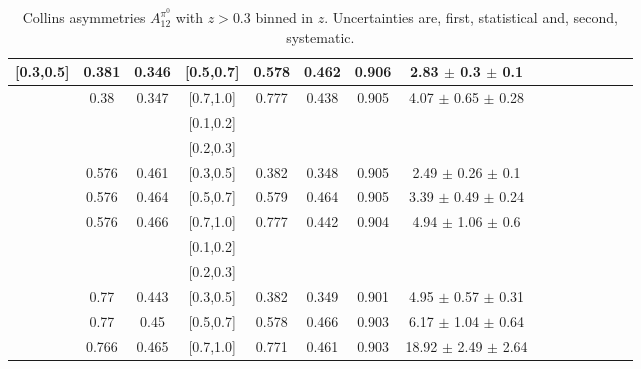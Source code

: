\documentclass[aps,prX,preprint,groupedaddress,linenumbers]{revtex4-1}
\begin{document}
\begin{table}[H]
\begin{tabular}{|c| c| c| c| c| c| c| c| c| c|c| c| c| c| c|}
[0.3,0.5]	&	0.381	&	0.346	&	[0.5,0.7]	&	0.578	&	0.462	&	0.906	& 2.83  $\pm$ 0.3  $\pm$ 0.1    	\\ \hline
[0.3,0.5]	&	0.38	&	0.347	&	[0.7,1.0]	&	0.777	&	0.438	&	0.905	& 4.07  $\pm$ 0.65  $\pm$ 0.28  	\\ \hline
\hline
[0.5,0.7]	&		&		&	[0.1,0.2]	&		&		&		&							\\ \hline
[0.5,0.7]	&		&		&	[0.2,0.3]	&		&		&		&							\\ \hline
[0.5,0.7]	&	0.576	&	0.461	&	[0.3,0.5]	&	0.382	&	0.348	&	0.905	&2.49  $\pm$ 0.26  $\pm$ 0.1  	\\ \hline
[0.5,0.7]	&	0.576	&	0.464	&	[0.5,0.7]	&	0.579	&	0.464	&	0.905	&3.39  $\pm$ 0.49  $\pm$ 0.24 	\\ \hline
[0.5,0.7]	&	0.576	&	0.466	&	[0.7,1.0]	&	0.777	&	0.442	&	0.904	&4.94  $\pm$ 1.06  $\pm$ 0.6  	\\ \hline
\hline
[0.7,1.0]	&		&		&	[0.1,0.2]	&		&		&		&							\\ \hline
[0.7,1.0]	&		&		&	[0.2,0.3]	&		&		&		&							\\ \hline
[0.7,1.0]	&	0.77	&	0.443	&	[0.3,0.5]	&	0.382	&	0.349	&	0.901	&4.95  $\pm$ 0.57  $\pm$ 0.31 	\\ \hline
[0.7,1.0]	&	0.77	&	0.45	&	[0.5,0.7]	&	0.578	&	0.466	&	0.903	&6.17  $\pm$ 1.04  $\pm$ 0.64 	\\ \hline
[0.7,1.0]	&	0.766	&	0.465	&	[0.7,1.0]	&	0.771	&	0.461	&	0.903	&18.92  $\pm$ 2.49  $\pm$ 2.64	\\ \hline
\end{tabular}
\caption[Collins asymmetries $A_{12}^{\pi^0}$ with $z>0.3$ binned in $z$]{Collins asymmetries $A_{12}^{\pi^0}$  with $z>0.3$ binned in $z$. Uncertainties are, first, statistical and, second, systematic.}
\label{tab:finaletazbin2}
\end{table}
\end{document}
